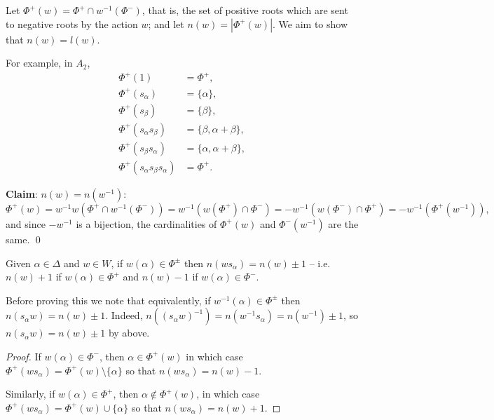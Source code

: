 Let $\Phi^+(w) = \Phi^+ \cap w^{-1}(\Phi^-)$, that is, the set of positive roots
which are sent to negative roots by the action $w$; and let
$n(w) = \left| \Phi^+(w) \right|$. We aim to show that $n(w) = l(w)$.

For example, in $A_2$, %
\begin{align*}
    \Phi^+(1) &= \Phi^+, \\
    \Phi^+(s_\alpha) &= \{\alpha\}, \\
    \Phi^+(s_\beta) &= \{\beta\}, \\
    \Phi^+(s_\alpha s_\beta) &= \{\beta, \alpha+\beta\}, \\
    \Phi^+(s_\beta s_\alpha) &= \{\alpha, \alpha+\beta\}, \\
    \Phi^+(s_\alpha s_\beta s_\alpha) &= \Phi^+.
\end{align*}

{\bf Claim}: $n(w) = n(w^{-1})$:
\[
    \Phi^+(w) = w^{-1} w \left( \Phi^+ \cap w^{-1} (\Phi^-) \right)
    = w^{-1} \left( w(\Phi^+) \cap \Phi^- \right)
    = - w^{-1} \left( w(\Phi^-) \cap \Phi^+ \right)
    = - w^{-1} \left( \Phi^+(w^{-1}) \right),
\]
and since $-w^{-1}$ is a bijection, the cardinalities of $\Phi^+(w)$ and
$\Phi^-(w^{-1})$ are the same. \qed

\begin{proposition}
Given $\alpha \in \Delta$ and $w \in W$, if $w(\alpha) \in \Phi^{\pm}$ then
$n(w s_\alpha) = n(w) \pm 1$ -- i.e. $n(w) + 1$ if $w(\alpha) \in \Phi^+$ and
$n(w) - 1$ if $w(\alpha) \in \Phi^-$.
\end{proposition}

Before proving this we note that equivalently, if $w^{-1}(\alpha) \in \Phi^\pm$
then $n(s_\alpha w) = n(w) \pm 1$. Indeed, $n((s_\alpha w)^{-1}) =
n(w^{-1} s_\alpha) = n(w^{-1}) \pm 1$, so $n(s_\alpha w) = n(w) \pm 1$ by above.

\begin{proof}
If $w(\alpha) \in \Phi^-$, then $\alpha \in \Phi^+(w)$ in which case
$\Phi^+(w s_\alpha) = \Phi^+(w) \setminus \{\alpha\}$ so that
$n(w s_\alpha) = n(w) - 1$.

Similarly, if $w(\alpha) \in \Phi^+$, then $\alpha \not\in \Phi^+(w)$, in which
case $\Phi^+(w s_\alpha) = \Phi^+(w) \cup \{\alpha\}$ so that
$n(w s_\alpha) = n(w) + 1$.
\end{proof}
